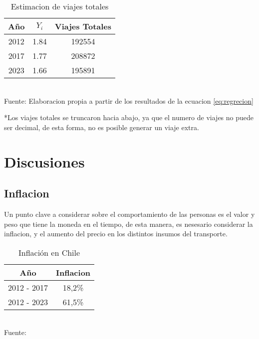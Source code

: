 \documentclass[12pt]{article} %
\begin{document}
\begin{table}[H]
    \centering
    \caption{Estimacion de viajes totales}
    \vspace{0.2cm}
    \begin{tabular}{|c|c|c|}
        \hline
        Año & $Y_i$ & Viajes Totales \\
        \hline
        2012 & 1.84 & 192554\\
        2017 & 1.77 & 208872\\
        2023 & 1.66 & 195891\\
        \hline
    \end{tabular}
    \vspace{0.2cm}
    \\ Fuente: Elaboracion propia a partir de los resultados de la ecuacion \ref{eq:regrecion}
\end{table}

*Los viajes totales se truncaron hacia abajo, ya que el numero de viajes no puede ser decimal, de esta forma, no es posible generar un viaje extra.

\section{Discusiones}

\subsection{Inflacion}

Un punto clave a considerar sobre el comportamiento de las personas es el valor y peso que tiene la moneda en el tiempo, de esta manera, es nesesario considerar la inflacion, y el aumento del precio en los distintos insumos del transporte.

\begin{table}[H]
    \centering
    \caption{Inflación en Chile}
    \vspace{0.2cm}
    \begin{tabular}{|c|c|}
        \hline
        Año & Inflacion \\
        \hline
        2012 - 2017 & 18,2\% \\
        2012 - 2023 & 61,5\% \\
        \hline
    \end{tabular}
    \vspace{0.2cm}
    \\Fuente: \textbf{\cite{ipc}}
\end{table}
\end{document}
